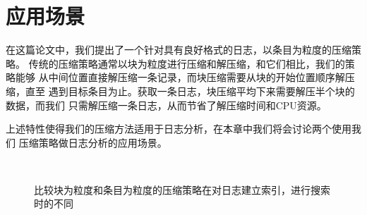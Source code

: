 \chapter{应用场景}
\label{chap:application}

在这篇论文中，我们提出了一个针对具有良好格式的日志，以条目为粒度的压缩策略。
传统的压缩策略通常以块为粒度进行压缩和解压缩，和它们相比，我们的策略能够
从中间位置直接解压缩一条记录，而块压缩需要从块的开始位置顺序解压缩，直至
遇到目标条目为止。获取一条日志，块压缩平均下来需要解压半个块的数据，而我们
只需解压缩一条日志，从而节省了解压缩时间和CPU资源。

上述特性使得我们的压缩方法适用于日志分析，在本章中我们将会讨论两个使用我们
压缩策略做日志分析的应用场景。

\begin{figure}
        \centering
        ~ %
        \caption{比较块为粒度和条目为粒度的压缩策略在对日志建立索引，进行搜索时的不同}
        \label{fig:compare}
\end{figure}


